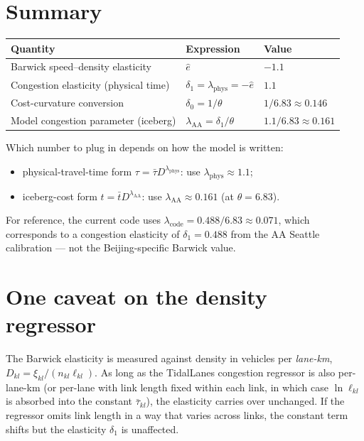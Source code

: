 \documentclass[11pt]{article}
\begin{document}
\section{Summary}

\renewcommand{\arraystretch}{1.3}
\begin{center}
\begin{tabular}{@{}>{\raggedright\arraybackslash}p{}
                  >{\raggedright\arraybackslash}p{}
                  >{\raggedright\arraybackslash}p{}@{}}
\toprule
Quantity & Expression & Value \\
\midrule
Barwick speed--density elasticity & $\hat{e}$ & $-1.1$ \\
Congestion elasticity (physical time) & $\delta_1=\lambda_{\mathrm{phys}}=-\hat{e}$ & $1.1$ \\
Cost-curvature conversion & $\delta_0=1/\theta$ & $1/6.83\approx 0.146$ \\
Model congestion parameter (iceberg) & $\lambda_{\mathrm{AA}}=\delta_1/\theta$ & $1.1/6.83\approx 0.161$ \\
\bottomrule
\end{tabular}
\end{center}

\noindent Which number to plug in depends on how the model is written:
\begin{itemize}
\item physical-travel-time form $\tau=\bar{\tau}D^{\lambda_{\mathrm{phys}}}$:
use $\lambda_{\mathrm{phys}}\approx 1.1$;
\item iceberg-cost form $t=\bar{t}D^{\lambda_{\mathrm{AA}}}$:
use $\lambda_{\mathrm{AA}}\approx 0.161$ (at $\theta=6.83$).
\end{itemize}
For reference, the current code uses $\lambda_{\mathrm{code}}=0.488/6.83\approx
0.071$, which corresponds to a congestion elasticity of $\delta_1=0.488$ from
the AA Seattle calibration --- not the Beijing-specific Barwick value.

\section{One caveat on the density regressor}

The Barwick elasticity is measured against density in vehicles per
\emph{lane-km}, $D_{kl}=\xi_{kl}/(n_{kl}\ell_{kl})$. As long as the TidalLanes
congestion regressor is also per-lane-km (or per-lane with link length fixed
within each link, in which case $\ln\ell_{kl}$ is absorbed into the constant
$\bar{\tau}_{kl}$), the elasticity carries over unchanged. If the regressor
omits link length in a way that varies across links, the constant term shifts
but the elasticity $\delta_1$ is unaffected.
\end{document}
